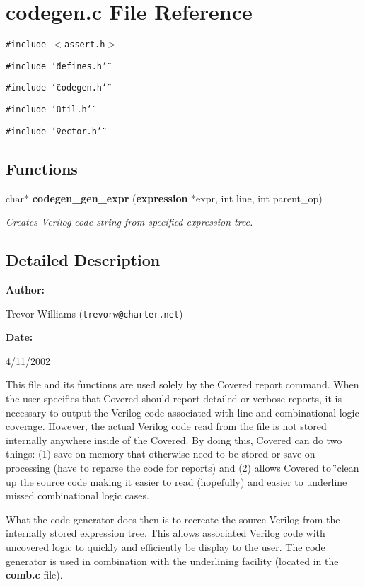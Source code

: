 \section{codegen.c File Reference}
\label{codegen_8c}
{\tt \#include $<$assert.h$>$}\par
{\tt \#include \char`\"{}defines.h\char`\"{}}\par
{\tt \#include \char`\"{}codegen.h\char`\"{}}\par
{\tt \#include \char`\"{}util.h\char`\"{}}\par
{\tt \#include \char`\"{}vector.h\char`\"{}}\par
\subsection*{Functions}
\begin{CompactItemize}
\item 
char$\ast$ {\bf codegen\_\-gen\_\-expr} ({\bf expression} $\ast$expr, int line, int parent\_\-op)
\begin{CompactList}\small\item\em Creates Verilog code string from specified expression tree.\item\end{CompactList}\end{CompactItemize}


\subsection{Detailed Description}


\begin{Desc}
\item[{\bf Author: }]\par
Trevor Williams ({\tt trevorw@charter.net}) \end{Desc}
\begin{Desc}
\item[{\bf Date: }]\par
4/11/2002

 This file and its functions are used solely by the Covered report command. When the user specifies that Covered should report detailed or verbose reports, it is necessary to output the Verilog code associated with line and combinational logic coverage. However, the actual Verilog code read from the file is not stored internally anywhere inside of the Covered. By doing this, Covered can do two things: (1) save on memory that otherwise need to be stored or save on processing (have to reparse the code for reports) and (2) allows Covered to \char`\"{}clean up the source code making it easier to read (hopefully) and easier to underline missed combinational logic cases.

 What the code generator does then is to recreate the source Verilog from the internally stored expression tree. This allows associated Verilog code with uncovered logic to quickly and efficiently be display to the user. The code generator is used in combination with the underlining facility (located in the {\bf comb.c} file).

\end{Desc}



